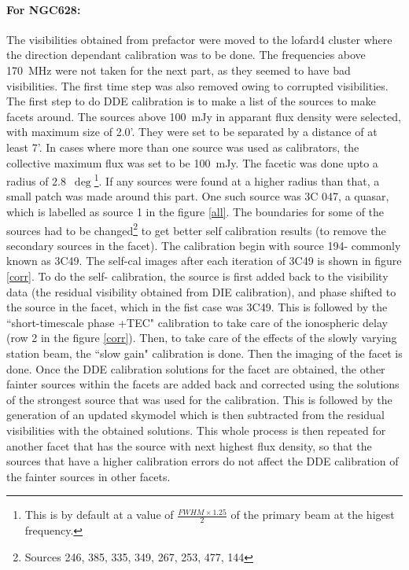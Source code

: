 \documentclass[../main/thesis_msc.tex]{subfiles}
\begin{document}
\paragraph{For NGC628:} The visibilities obtained from prefactor were moved to the lofard4 cluster where the direction dependant calibration was to be done. The frequencies above 170~MHz were not taken for the next part, as they seemed to have bad visibilities. The first time step was also removed owing to corrupted visibilities. The first step to do DDE calibration is to make a list of the sources to make facets around. The sources above 100~mJy in apparant flux density were selected, with maximum size of 2.0'. They were set to be separated by a distance of at least 7'. In cases where more than one source was used as calibrators, the collective maximum flux was set to be 100~mJy. The facetic was done upto a radius of 2.8~$\deg$\footnote{This is by default at a value of $\frac{FWHM \times 1.25}{2}$ of the primary beam at the higest frequency.}. If any sources were found at a higher radius than that, a small patch was made around this part. One such source was 3C 047, a quasar, which is labelled as source 1 in the figure \ref{all}. The boundaries for some of the sources had to be changed\footnote{Sources 246, 385, 335, 349, 267, 253, 477, 144} to get better self calibration results (to remove the secondary sources in the facet). The calibration begin with source 194- commonly known as 3C49. The self-cal images after each iteration of 3C49 is shown in figure \ref{corr}. To do the self- calibration, the source is first added back to the visibility data (the residual visibility obtained from DIE calibration), and phase shifted to the source in the facet, which in the fist case was 3C49. This is followed by the ``short-timescale phase +TEC" calibration to take care of the ionospheric delay (row 2 in the figure \ref{corr}). Then, to take care of the effects of the slowly varying station beam, the ``slow gain" calibration is done. Then the imaging of the facet is done. Once the DDE calibration solutions for the facet are obtained, the other fainter sources within the facets are added back and corrected using the solutions of the strongest source that was used for the calibration. This is followed by the generation of an updated skymodel which is then subtracted from the residual visibilities with the obtained solutions. This whole process is then repeated for another facet that has the source with next highest flux density, so that the sources that have a higher calibration errors do not affect the DDE calibration of the fainter sources in other facets.\\
\end{document}
